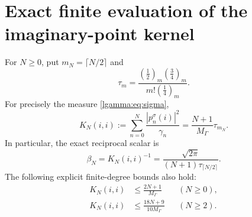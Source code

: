 \section{Exact finite evaluation of the imaginary-point kernel}

\begin{lgammatheorem}\label{lgamma:thm:kernel}
For $N\ge0$, put $m_N=\lceil N/2\rceil$ and
\[
 \tau_m=\frac{(\tfrac12)_m(\tfrac34)_m}{m!(\tfrac14)_m}.
\]
For precisely the measure \eqref{lgamma:eq:sigma},
\begin{equation}\label{lgamma:eq:exactkernel}
 \boxed{K_N(i,i):=\sum_{n=0}^N\frac{|p_n^\sigma(i)|^2}{\gamma_n}
       =\frac{N+1}{M_\Gamma}\tau_{m_N}.}
\end{equation}
In particular, the exact reciprocal scalar is
\begin{equation}\label{lgamma:eq:beta}
 \boxed{\beta_N=K_N(i,i)^{-1}
 =\frac{\sqrt{2\pi}}{(N+1)\tau_{\lceil N/2\rceil}}.}
\end{equation}
The following explicit finite-degree bounds also hold:
\begin{align}
 K_N(i,i)&\le\frac{2N+1}{M_\Gamma}&& (N\ge0),\label{lgamma:eq:linear}\\
 K_N(i,i)&\le\frac{18N+9}{10M_\Gamma}&& (N\ge2).\label{lgamma:eq:betterlinear}
\end{align}
\end{lgammatheorem}
